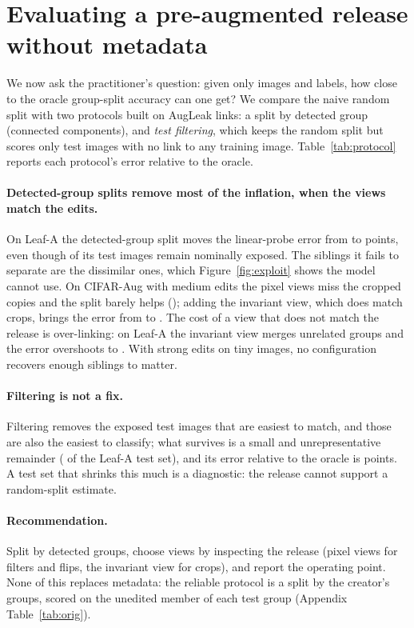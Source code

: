 \section{Evaluating a pre-augmented release without metadata}
\label{sec:protocol}

We now ask the practitioner's question: given only images and labels, how close to the oracle group-split accuracy can one get? We compare the naive random split with two protocols built on AugLeak links: a split by detected group (connected components), and \emph{test filtering}, which keeps the random split but scores only test images with no link to any training image. Table~\ref{tab:protocol} reports each protocol's error relative to the oracle.



\paragraph{Detected-group splits remove most of the inflation, when the views match the edits.}
On Leaf-A the detected-group split moves the linear-probe error from \numProtLeafAnaiveErr{} to \numProtLeafAdgroupErr{} points, even though \numProtLeafAdgroupExp{} of its test images remain nominally exposed. The siblings it fails to separate are the dissimilar ones, which Figure~\ref{fig:exploit} shows the model cannot use. On CIFAR-Aug with medium edits the pixel views miss the cropped copies and the split barely helps (\numProtCmediumdgroupErr{}); adding the invariant view, which does match crops, brings the error from \numProtCmediumnaiveErr{} to \numProtCmediumInvdgroupErr{}. The cost of a view that does not match the release is over-linking: on Leaf-A the invariant view merges unrelated groups and the error overshoots to \numProtLeafAInvdgroupErr{}. With strong edits on tiny images, no configuration recovers enough siblings to matter.

\paragraph{Filtering is not a fix.}
Filtering removes the exposed test images that are easiest to match, and those are also the easiest to classify; what survives is a small and unrepresentative remainder (\numProtLeafAfilterKept{} of the Leaf-A test set), and its error relative to the oracle is \numProtLeafAfilterErr{} points. A test set that shrinks this much is a diagnostic: the release cannot support a random-split estimate.

\paragraph{Recommendation.}
Split by detected groups, choose views by inspecting the release (pixel views for filters and flips, the invariant view for crops), and report the operating point. None of this replaces metadata: the reliable protocol is a split by the creator's groups, scored on the unedited member of each test group (Appendix Table~\ref{tab:orig}).
